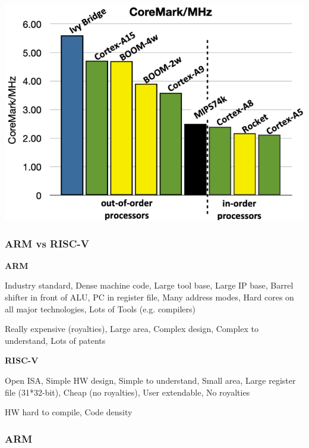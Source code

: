 \documentclass[
  10pt,
  a4paper,
]{article}
\begin{document}
\begin{multicols*}{2}
\includegraphics{images/performance/image-4.png}

\subsubsection{ARM vs RISC-V}\label{arm-vs-risc-v}

\textbf{ARM}
{\footnotesize\begin{description}[parsep=0mm,labelsep=2pt,labelwidth=8pt]
  \item[\color{OliveGreen}\faPlus] Industry standard, Dense machine code, Large tool base, Large IP base, Barrel shifter in front of ALU, PC in register file, Many address modes, Hard cores on all major technologies, Lots of Tools (e.g. compilers)
  \item[\color{BrickRed}\faMinus] Really expensive (royalties), Large area, Complex design, Complex to understand, Lots of patents
\end{description}}

\textbf{RISC-V}
{\footnotesize\begin{description}[parsep=0mm,labelsep=2pt,labelwidth=8pt]
  \item[\color{OliveGreen}\faPlus] Open ISA, Simple HW design, Simple to understand, Small area, Large register file (31*32-bit), Cheap (no royalties), User extendable, No royalties
  \item[\color{BrickRed}\faMinus] HW hard to compile, Code density
\end{description}}

\subsubsection{ARM}\label{arm}


\end{multicols*}
\end{document}
